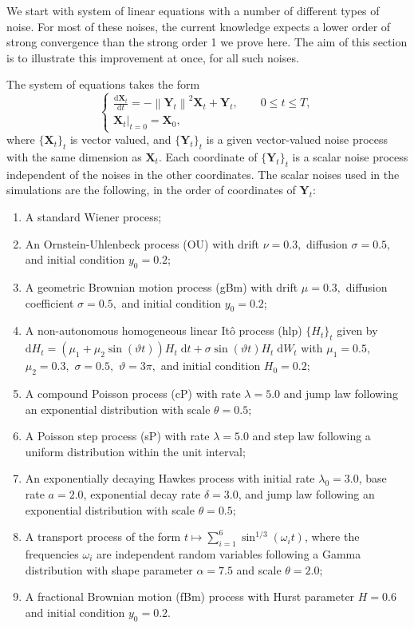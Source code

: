 \documentclass[reqno,12pt]{amsart}
\theoremstyle{plain} %
\theoremstyle{definition} %
\begin{document}
We start with system of linear equations with a number of different types of noise. For most of these noises, the current knowledge expects a lower order of strong convergence than the strong order 1 we prove here. The aim of this section is to illustrate this improvement at once, for all such noises.

The system of equations takes the form
\begin{equation}
    \label{allnoisesRODEsystem}
    \begin{cases}
        \displaystyle \frac{\mathrm{d}\mathbf{X}_t}{\mathrm{d} t} = - \left\|\mathbf{Y}_t\right\|^2 \mathbf{X}_t + \mathbf{Y}_t, \qquad 0 \leq t \leq T, \\
        \left. \mathbf{X}_t \right|_{t = 0} = \mathbf{X}_0,
    \end{cases}
\end{equation}
where $\{\mathbf{X}_t\}_t$ is vector valued, and $\{\mathbf{Y}_t\}_t$ is a given vector-valued noise process with the same dimension as $\mathbf{X}_t$. Each coordinate of $\{\mathbf{Y}_t\}_t$ is a scalar noise process independent of the noises in the other coordinates. The scalar noises used in the simulations are the following, in the order of coordinates of $\mathbf{Y}_t$:
\begin{enumerate}
    \item A standard Wiener process;
    \item An Ornstein-Uhlenbeck process (OU) with drift $\nu = 0.3,$ diffusion $\sigma = 0.5,$ and initial condition $y_0 = 0.2$;
    \item A geometric Brownian motion process (gBm) with drift $\mu = 0.3,$ diffusion coefficient $\sigma = 0.5,$ and initial condition $y_0 = 0.2$;
    \item A non-autonomous homogeneous linear It\^o process (hlp) $\{H_t\}_t$ given by $\mathrm{d}H_t = (\mu_1 + \mu_2\sin(\vartheta t))H_t\;\mathrm{d}t + \sigma\sin(\vartheta t)H_t\;\mathrm{d}W_t$ with $\mu_1 = 0.5,$ $\mu_2 = 0.3,$ $\sigma = 0.5,$ $\vartheta=3\pi,$ and initial condition $H_0 = 0.2;$
    \item A compound Poisson process (cP) with rate $\lambda = 5.0$ and jump law following an exponential distribution with scale $\theta = 0.5;$
    \item A Poisson step process (sP) with rate $\lambda = 5.0$ and step law following a uniform distribution within the unit interval;
    \item An exponentially decaying Hawkes process with initial rate $\lambda_0 = 3.0$, base rate $a = 2.0$, exponential decay rate $\delta = 3.0$, and jump law following an exponential distribution with scale $\theta = 0.5;$
    \item A transport process of the form $t \mapsto \sum_{i=1}^{6} \sin^{1/3}(\omega_i t)$, where the frequencies $\omega_i$ are independent random variables following a Gamma distribution with shape parameter $\alpha = 7.5$ and scale $\theta = 2.0;$
    \item A fractional Brownian motion (fBm) process with Hurst parameter $H=0.6$ and initial condition $y_0 = 0.2$.
\end{enumerate}
\end{document}
